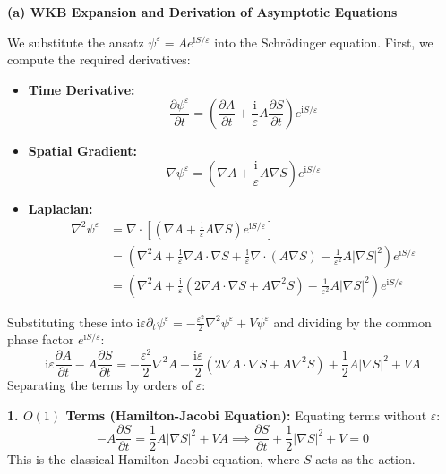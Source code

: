\begin{solution}
\textbf{(a) WKB Expansion and Derivation of Asymptotic Equations}

We substitute the ansatz $\psi^\varepsilon = A e^{\mathrm{i} S / \varepsilon}$ into the Schrödinger equation. First, we compute the required derivatives:
\begin{itemize}
    \item \textbf{Time Derivative:}
    \[ \frac{\partial \psi^\varepsilon}{\partial t} = \left( \frac{\partial A}{\partial t} + \frac{\mathrm{i}}{\varepsilon} A \frac{\partial S}{\partial t} \right) e^{\mathrm{i} S / \varepsilon} \]
    \item \textbf{Spatial Gradient:}
    \[ \nabla \psi^\varepsilon = \left( \nabla A + \frac{\mathrm{i}}{\varepsilon} A \nabla S \right) e^{\mathrm{i} S / \varepsilon} \]
    \item \textbf{Laplacian:}
    \begin{align*}
        \nabla^2 \psi^\varepsilon &= \nabla \cdot \left[ \left( \nabla A + \frac{\mathrm{i}}{\varepsilon} A \nabla S \right) e^{\mathrm{i} S / \varepsilon} \right] \\
        &= \left( \nabla^2 A + \frac{\mathrm{i}}{\varepsilon} \nabla A \cdot \nabla S + \frac{\mathrm{i}}{\varepsilon} \nabla \cdot (A \nabla S) - \frac{1}{\varepsilon^2} A |\nabla S|^2 \right) e^{\mathrm{i} S / \varepsilon} \\
        &= \left( \nabla^2 A + \frac{\mathrm{i}}{\varepsilon} (2 \nabla A \cdot \nabla S + A \nabla^2 S) - \frac{1}{\varepsilon^2} A |\nabla S|^2 \right) e^{\mathrm{i} S / \varepsilon}
    \end{align*}
\end{itemize}

Substituting these into $\mathrm{i} \varepsilon \partial_t \psi^\varepsilon = -\frac{\varepsilon^2}{2} \nabla^2 \psi^\varepsilon + V \psi^\varepsilon$ and dividing by the common phase factor $e^{\mathrm{i} S / \varepsilon}$:
\[ \mathrm{i} \varepsilon \frac{\partial A}{\partial t} - A \frac{\partial S}{\partial t} = -\frac{\varepsilon^2}{2} \nabla^2 A - \frac{\mathrm{i} \varepsilon}{2} (2 \nabla A \cdot \nabla S + A \nabla^2 S) + \frac{1}{2} A |\nabla S|^2 + V A \]
Separating the terms by orders of $\varepsilon$:

\textbf{1. $O(1)$ Terms (Hamilton-Jacobi Equation):}
Equating terms without $\varepsilon$:
\[ -A \frac{\partial S}{\partial t} = \frac{1}{2} A |\nabla S|^2 + V A \implies \boxed{\frac{\partial S}{\partial t} + \frac{1}{2} |\nabla S|^2 + V = 0} \]
This is the classical Hamilton-Jacobi equation, where $S$ acts as the action.


\end{solution}
